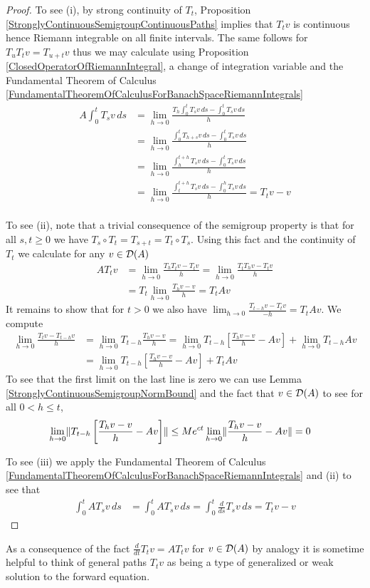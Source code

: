 \begin{proof}
To see (i), by strong continuity of $T_t$, Proposition \ref{StronglyContinuousSemigroupContinuousPaths} implies  that $T_tv$ is continuous hence Riemann integrable on all finite intervals.  The same follows for $T_u T_t v = T_{u+t}v$ thus we may calculate using Proposition \ref{ClosedOperatorOfRiemannIntegral}, a change of integration variable and the Fundamental Theorem of Calculus \ref{FundamentalTheoremOfCalculusForBanachSpaceRiemannIntegrals}
\begin{align*}
A \int_0^t T_sv \, ds &= \lim_{h \to 0}  \frac{T_h \int_0^t T_sv \, ds - \int_0^t T_sv \, ds}{h} \\
&= \lim_{h \to 0}  \frac{\int_0^t T_{h+s} v \, ds - \int_0^t T_sv \, ds}{h} \\
&= \lim_{h \to 0}  \frac{\int_h^{t+h} T_{s} v \, ds - \int_0^t T_sv \, ds}{h} \\
&= \lim_{h \to 0}  \frac{\int_t^{t+h} T_{s} v \, ds - \int_0^h T_sv \, ds}{h} = T_t v - v\\
\end{align*}

To see (ii), note that a trivial consequence of the semigroup property is that for all $s,t \geq 0$ we have $T_s \circ T_t = T_{s+t} = T_t \circ T_s$.  Using this fact and
the continuity of $T_t$ we calculate for any $v \in \mathcal{D}(A)$ 
\begin{align*}
A T_t v &= \lim_{h \to 0} \frac{T_h T_t v - T_t v}{h} =\lim_{h \to 0} \frac{T_t T_h v - T_t v}{h} \\
&= T_t \lim_{h \to 0} \frac{T_h v - v}{h} = T_t A v
\end{align*}
It remains to show that for $t > 0$ we also have $\lim_{h \to 0} \frac{T_{t-h} v - T_t v}{-h} = T_t A v$.  
We compute
\begin{align*}
\lim_{h \to 0} \frac{T_t v - T_{t-h} v}{h} &= \lim_{h \to 0} T_{t-h} \frac{T_h v - v}{h} 
= \lim_{h \to 0} T_{t-h} \left[\frac{T_h v - v}{h} -Av\right] + \lim_{h \to 0} T_{t-h} Av \\
&=\lim_{h \to 0} T_{t-h} \left[\frac{T_h v - v}{h} -Av\right] + T_t Av
\end{align*}
To see that the first limit on the last line is zero we can use Lemma \ref{StronglyContinuousSemigroupNormBound} and the fact that $v \in \mathcal{D}(A)$ to see for all $0 < h \leq t$,
\begin{align*}
\lim_{h \to 0} \lVert T_{t-h} \left[\frac{T_h v - v}{h} -Av\right] \rVert &\leq M e^{ct} \lim_{h \to 0} \lVert \frac{T_h v - v}{h} -Av \rVert = 0
\end{align*}

To see (iii) we apply the Fundamental Theorem of Calculus \ref{FundamentalTheoremOfCalculusForBanachSpaceRiemannIntegrals} and (ii) to see that
\begin{align*}
\int_0^t A T_s v \, ds &= \int_0^t A T_s v \, ds = \int_0^t \frac{d}{ds} T_s v \, ds = T_t v - v
\end{align*}
\end{proof}
As a consequence of the fact $\frac{d}{dt} T_t v = A T_t v$ for $v \in \mathcal{D}(A)$ by analogy it is sometime helpful to think of general paths $T_t v$ as being a type of generalized or weak solution to the forward equation.

